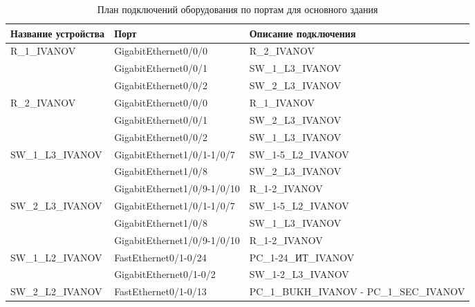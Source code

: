 \documentclass[14pt, a4paper]{extarticle}
\begin{document}
\begin{table}[H]
  \caption{План подключений оборудования по портам для основного здания\label{tab:hq_connection_plan}}
  \centering
  \small
  \begin{tabularx}{\textwidth}{|s|s|s|}
    \hline
    Название устройства & Порт                         & Описание подключения                      \\ \hline
    R\_1\_IVANOV        & GigabitEthernet0/0/0         & R\_2\_IVANOV                              \\ 
                        & GigabitEthernet0/0/1         & SW\_1\_L3\_IVANOV                         \\ 
                        & GigabitEthernet0/0/2         & SW\_2\_L3\_IVANOV                         \\ \hline
    R\_2\_IVANOV        & GigabitEthernet0/0/0         & R\_1\_IVANOV                              \\ 
                        & GigabitEthernet0/0/1         & SW\_2\_L3\_IVANOV                         \\ 
                        & GigabitEthernet0/0/2         & SW\_1\_L3\_IVANOV                         \\ \hline
    SW\_1\_L3\_IVANOV   & GigabitEthernet1/0/1-1/0/7   & SW\_1-5\_L2\_IVANOV                       \\ 
                        & GigabitEthernet1/0/8         & SW\_2\_L3\_IVANOV                         \\ 
                        & GigabitEthernet1/0/9-1/0/10  & R\_1-2\_IVANOV                            \\ \hline
    SW\_2\_L3\_IVANOV   & GigabitEthernet1/0/1-1/0/7   & SW\_1-5\_L2\_IVANOV                       \\ 
                        & GigabitEthernet1/0/8         & SW\_1\_L3\_IVANOV                         \\ 
                        & GigabitEthernet1/0/9-1/0/10  & R\_1-2\_IVANOV                            \\ \hline
    SW\_1\_L2\_IVANOV   & FastEthernet0/1-0/24         & PC\_1-24\_ИТ\_IVANOV                      \\ 
                        & GigabitEthernet0/1-0/2       & SW\_1-2\_L3\_IVANOV                       \\ \hline
    SW\_2\_L2\_IVANOV   & FastEthernet0/1-0/13         & PC\_1\_BUKH\_IVANOV - PC\_1\_SEC\_IVANOV  \\ 

\end{tabularx}
\end{table}
\end{document}
